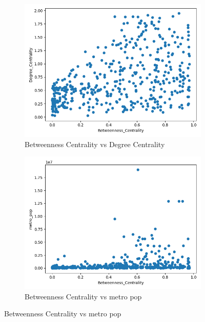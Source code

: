 \begin{figure}[H]
     \centering
     \begin{subfigure}[b]{0.3\textwidth}
         \centering
         \includegraphics[width=\textwidth]{images/comparison/ALL/relationship_Betweenness_Centrality_vs_Degree_Centrality_ALL.png}
         \caption{Betweenness Centrality vs Degree Centrality}
     \end{subfigure}
     \hfill
     \begin{subfigure}[b]{0.3\textwidth}
         \centering
         \includegraphics[width=\textwidth]{images/comparison/ALL/relationship_Betweenness_Centrality_vs_metro_pop_ALL.png}
         \caption{Betweenness Centrality vs metro pop}

\end{subfigure}
\end{figure}
